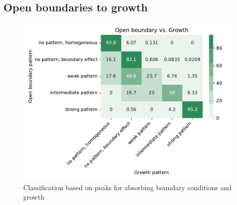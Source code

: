 \subsection{Open boundaries to growth}

\begin{figure}[H] %
    \centering
    \begin{adjustbox}{center}
        \includegraphics[width=1\textwidth]{chapters/Chapter 1/openboundary_edgegrowth2_confusion_variant0-11-12} %
    \end{adjustbox}
    \caption{Classification based on peaks for absorbing boundary conditions and growth}
    \label{fig:openboundary_edgegrowth2_confusion_variant0} %
\end{figure}


